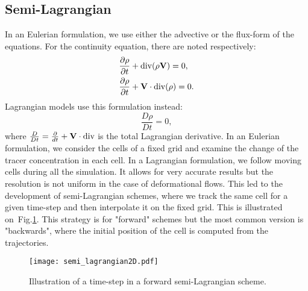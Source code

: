 \subsection{Semi-Lagrangian}
In an Eulerian formulation, we use either the advective or the flux-form of the
equations. For the continuity equation, there are noted respectively:
\begin{align}
  \frac{\partial \rho}{\partial t} &+ {\rm div}(\rho {\bf V}) = 0,\\
  \label{eqn:cont_flux}
  \frac{\partial \rho}{\partial t} &+ {\bf V}\cdot{\rm div}(\rho) = 0.
\end{align}
Lagrangian models use this formulation instead:
\begin{equation}
  \label{eqn:cont_lagrang}
  \frac{D \rho}{Dt} = 0,
\end{equation}
where $\frac{D}{Dt}=\frac{\partial}{dt} + {\bf V}\cdot{\rm div}$ is the total
Lagrangian derivative. In an Eulerian formulation, we consider the cells of a
fixed grid and examine the change of the tracer concentration in each cell. In a
Lagrangian formulation, we follow moving cells during all the simulation.  It
allows for very accurate results but the resolution is not uniform in the case
of deformational flows.
This led to the development of semi-Lagrangian schemes, where we track the same
cell for a given time-step and then interpolate it on the fixed grid. This is
illustrated on~Fig.\ref{fig:semi-lagrang}. This strategy is for "forward"
schemes but the most common version is "backwards", where the initial position
of the cell is computed from the trajectories.
\begin{figure}
  \centering
  \texttt{[image: semi\_lagrangian2D.pdf]}
  \caption{Illustration of a time-step in a forward semi-Lagrangian scheme.}
  \label{fig:semi-lagrang}
\end{figure}

